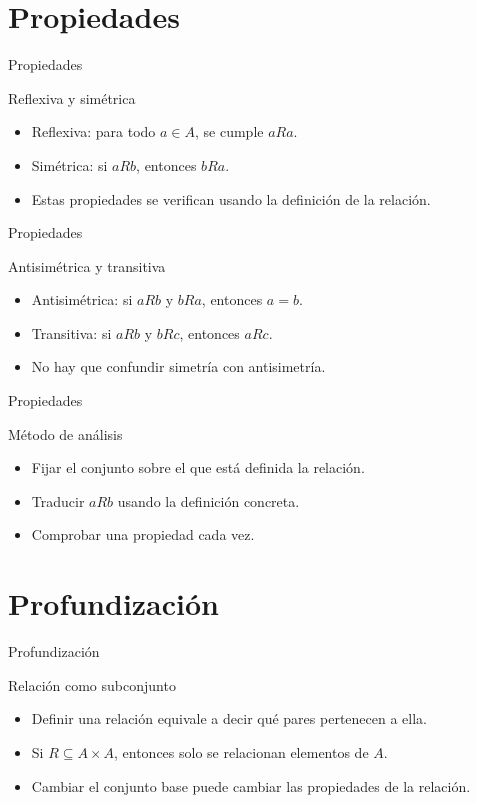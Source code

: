 \documentclass[aspectratio=169,11pt]{beamer}
\begin{document}
\section{Propiedades}

\begin{frame}{Propiedades}
\begin{block}{Reflexiva y simétrica}
\begin{itemize}
  \item Reflexiva: para todo \(a\in A\), se cumple \(aRa\).
  \item Simétrica: si \(aRb\), entonces \(bRa\).
  \item Estas propiedades se verifican usando la definición de la relación.
\end{itemize}
\end{block}
\end{frame}

\begin{frame}{Propiedades}
\begin{block}{Antisimétrica y transitiva}
\begin{itemize}
  \item Antisimétrica: si \(aRb\) y \(bRa\), entonces \(a=b\).
  \item Transitiva: si \(aRb\) y \(bRc\), entonces \(aRc\).
  \item No hay que confundir simetría con antisimetría.
\end{itemize}
\end{block}
\end{frame}

\begin{frame}{Propiedades}
\begin{block}{Método de análisis}
\begin{itemize}
  \item Fijar el conjunto sobre el que está definida la relación.
  \item Traducir \(aRb\) usando la definición concreta.
  \item Comprobar una propiedad cada vez.
\end{itemize}
\end{block}
\end{frame}

\section{Profundización}

\begin{frame}{Profundización}
\begin{block}{Relación como subconjunto}
\begin{itemize}
  \item Definir una relación equivale a decir qué pares pertenecen a ella.
  \item Si \(R\subseteq A\times A\), entonces solo se relacionan elementos de \(A\).
  \item Cambiar el conjunto base puede cambiar las propiedades de la relación.
\end{itemize}
\end{block}
\end{frame}
\end{document}

